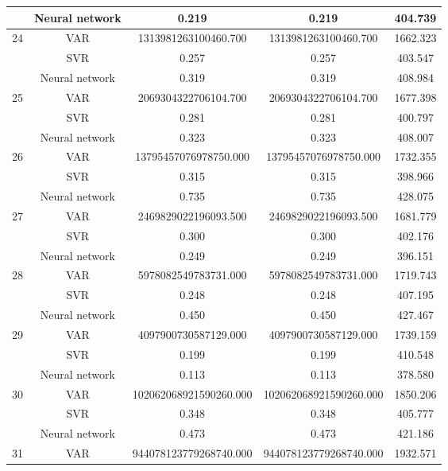 \documentclass[12pt]{article}
\begin{document}
\begin{longtable}{|p{2cm}|c|c|c|c|}
\cline{2-5}
 &Neural network &   0.219 &    0.219 &    404.739\\
\cline{2-5}
\hline
\multirow{3}{*}{24} &VAR &   1313981263100460.700 &    1313981263100460.700 &    1662.323\\
\cline{2-5}
 &SVR &   0.257 &    0.257 &    403.547\\
\cline{2-5}
 &Neural network &   0.319 &    0.319 &    408.984\\
\cline{2-5}
\hline
\multirow{3}{*}{25} &VAR &   2069304322706104.700 &    2069304322706104.700 &    1677.398\\
\cline{2-5}
 &SVR &   0.281 &    0.281 &    400.797\\
\cline{2-5}
 &Neural network &   0.323 &    0.323 &    408.007\\
\cline{2-5}
\hline
\multirow{3}{*}{26} &VAR &   13795457076978750.000 &    13795457076978750.000 &    1732.355\\
\cline{2-5}
 &SVR &   0.315 &    0.315 &    398.966\\
\cline{2-5}
 &Neural network &   0.735 &    0.735 &    428.075\\
\cline{2-5}
\hline
\multirow{3}{*}{27} &VAR &   2469829022196093.500 &    2469829022196093.500 &    1681.779\\
\cline{2-5}
 &SVR &   0.300 &    0.300 &    402.176\\
\cline{2-5}
 &Neural network &   0.249 &    0.249 &    396.151\\
\cline{2-5}
\hline
\multirow{3}{*}{28} &VAR &   5978082549783731.000 &    5978082549783731.000 &    1719.743\\
\cline{2-5}
 &SVR &   0.248 &    0.248 &    407.195\\
\cline{2-5}
 &Neural network &   0.450 &    0.450 &    427.467\\
\cline{2-5}
\hline
\multirow{3}{*}{29} &VAR &   4097900730587129.000 &    4097900730587129.000 &    1739.159\\
\cline{2-5}
 &SVR &   0.199 &    0.199 &    410.548\\
\cline{2-5}
 &Neural network &   0.113 &    0.113 &    378.580\\
\cline{2-5}
\hline
\multirow{3}{*}{30} &VAR &   102062068921590260.000 &    102062068921590260.000 &    1850.206\\
\cline{2-5}
 &SVR &   0.348 &    0.348 &    405.777\\
\cline{2-5}
 &Neural network &   0.473 &    0.473 &    421.186\\
\cline{2-5}
\hline
\multirow{3}{*}{31} &VAR &   944078123779268740.000 &    944078123779268740.000 &    1932.571\\

\end{longtable}
\end{document}
